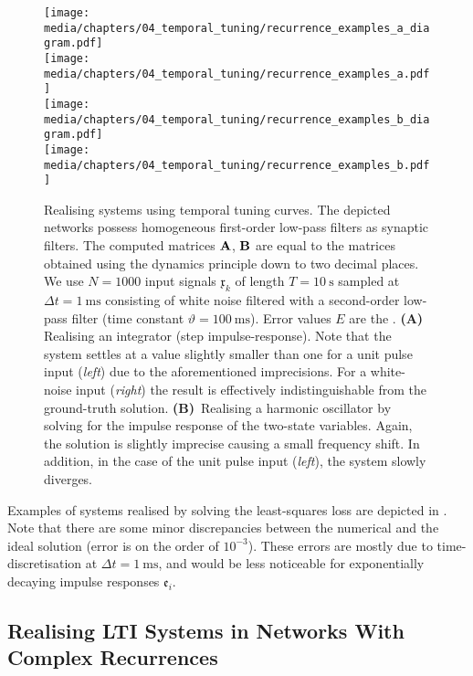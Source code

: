 \begin{figure}[p]
	\centering
	\texttt{[image: media/chapters/04\_temporal\_tuning/recurrence\_examples\_a\_diagram.pdf]}\\[0.5em]
	\texttt{[image: media/chapters/04\_temporal\_tuning/recurrence\_examples\_a.pdf]}\\[1em]
	\texttt{[image: media/chapters/04\_temporal\_tuning/recurrence\_examples\_b\_diagram.pdf]}\\[0.5em]
	\texttt{[image: media/chapters/04\_temporal\_tuning/recurrence\_examples\_b.pdf]}%
	{\label{fig:recurrence_examples_1a}}%
	{\label{fig:recurrence_examples_1b}}%
	\caption[Realising LTI systems using temporal tuning curves]{
		Realising \LTI systems using temporal tuning curves.
		The depicted networks possess homogeneous first-order low-pass filters as synaptic filters.
		The computed matrices $\mathbf{A}$, $\mathbf{B}$ are equal to the matrices obtained using the \NEF dynamics principle down to two decimal places.
		We use $N = 1000$ input signals $\mathfrak{x}_k$ of length $T = \SI{10}{\second}$ sampled at $\Delta t = \SI{1}{\milli\second}$ consisting of white noise filtered with a second-order low-pass filter (time constant $\vartheta = \SI{100}{\milli\second}$).
		Error values $E$ are the \NRMSE.
		\textbf{(A)} Realising an integrator (step impulse-response).
		Note that the system settles at a value slightly smaller than one for a unit pulse input (\emph{left}) due to the aforementioned imprecisions. For a white-noise input (\emph{right}) the result is effectively indistinguishable from the ground-truth solution.
		\textbf{(B)}~Realising a harmonic oscillator by solving for the impulse response of the two-state variables.
		Again, the solution is slightly imprecise causing a small frequency shift.
		In addition, in the case of the unit pulse input (\emph{left}), the system slowly diverges.
	}
	\label{fig:recurrence_examples_1}
\end{figure}

Examples of \LTI systems realised by solving the least-squares loss are depicted in .
Note that there are some minor discrepancies between the numerical and the ideal solution (error is on the order of $10^{-3}$).
These errors are mostly due to time-discretisation at $\Delta t = \SI{1}{\milli\second}$, and would be less noticeable for exponentially decaying impulse responses $\mathfrak{e}_i$.

\newpage

\subsection{Realising LTI Systems in Networks With Complex Recurrences}
\label{sec:lti_complex_networks}

